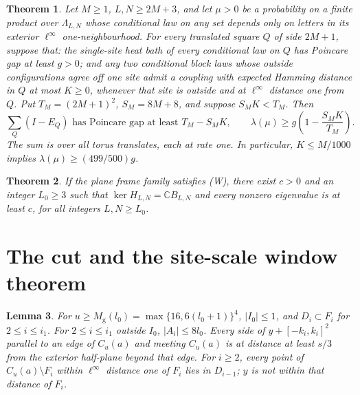 \documentclass[11pt,reqno]{amsart}
\newtheorem{theorem}{Theorem}[section]
\newtheorem{lemma}[theorem]{Lemma}
\theoremstyle{definition}
\theoremstyle{remark}
\begin{document}
\begin{theorem}\label{t:periodic}
Let \(M\ge1\), \(L,N\ge2M+3\), and let \(\mu>0\) be a
probability on a finite product over \(\Lambda_{L,N}\) whose
conditional law on any set depends only on letters in its exterior
\(\ell^\infty\) one-neighbourhood.
For every translated square \(Q\) of side \(2M+1\), suppose that:
the single-site heat bath of every conditional law on \(Q\) has Poincare gap at least
\(g>0\); and any two conditional block laws whose outside
configurations agree off one site admit a coupling with expected
Hamming distance in \(Q\) at most \(K\ge0\), whenever that site is
outside and at \(\ell^\infty\) distance one from \(Q\).
Put \(T_M=(2M+1)^2\), \(S_M=8M+8\), and suppose \(S_MK<T_M\).
Then
\[
 \sum_{Q}(I-E_Q)\text{ has Poincare gap at least }T_M-S_MK,\qquad
 \lambda(\mu)\ge g\left(1-\frac{S_MK}{T_M}\right).
\]
The sum is over all torus translates, each at rate one.
In particular, \(K\le M/1000\) implies
\(\lambda(\mu)\ge(499/500)g\).
\end{theorem}

\begin{theorem}\label{t:mainW}
If the plane frame family satisfies (W), there exist \(c>0\) and
an integer \(L_0\ge3\) such that
\(\ker H_{L,N}=\mathbb C B_{L,N}\) and every nonzero eigenvalue is
at least \(c\), for all integers \(L,N\ge L_0\).
\end{theorem}


\section{The cut and the site-scale window theorem}

\begin{lemma}\label{l:shellgeom}
For \(u\ge M_{\mathrm g}(l_0)=\max\{16,6(l_0+1)\}^4\),
\(|I_0|\le1\), and \(D_i\subset F_i\) for \(2\le i\le i_1\).
For \(2\le i\le i_1\) outside \(I_0\), \(|A_i|\le8l_0\).
Every side of \(y+[-k_i,k_i]^2\) parallel to an edge of \(C_u(a)\)
and meeting \(C_u(a)\) is at distance at least \(s/3\) from the
exterior half-plane beyond that edge.
For \(i\ge2\), every point of \(C_u(a)\setminus F_i\)
within \(\ell^\infty\) distance one of \(F_i\) lies in \(D_{i-1}\);
\(y\) is not within that distance of \(F_i\).
\end{lemma}
\end{document}
